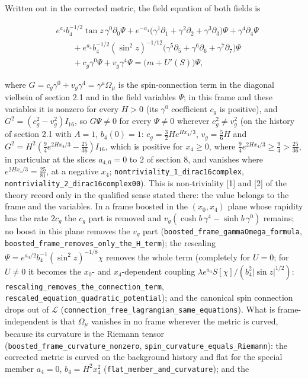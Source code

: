 \documentclass[11pt]{article}
\begin{document}
Written out in the corrected metric, the field equation of both fields is

\[
\begin{aligned}
& e^{a_4}b_4^{-1/2}\tan z\,\gamma^0\partial_0\Psi + e^{-a_4}\big(\gamma^1\partial_1+\gamma^2\partial_2+\gamma^3\partial_3\big)\Psi + \gamma^4\partial_4\Psi \\
& \qquad + e^{a_4}b_4^{-1/2}(\sin^2 z)^{-1/12}\big(\gamma^5\partial_5+\gamma^6\partial_6+\gamma^7\partial_7\big)\Psi \\
& \qquad + c_g\gamma^0\Psi + v_g\gamma^4\Psi = \big(m + U'(S)\big)\Psi ,
\end{aligned}
\]

where $G = c_g\gamma^0 + v_g\gamma^4 = \gamma^\mu\Omega_\mu$ is the spin-connection term in the diagonal vielbein of section 2.1 and in the field variables $\Psi$; in this frame and these variables it is nonzero for every $H > 0$ (its $\gamma^0$ coefficient $c_g$ is positive), and $G^2 = (c_g^2 - v_g^2)I_{16}$, so $G\Psi \neq 0$ for every $\Psi \neq 0$ wherever $c_g^2 \neq v_g^2$ (on the history of section 2.1 with $A = 1$, $b_4(0) = 1$: $c_g = \frac32He^{Hx_4/3}$, $v_g = \frac56H$ and $G^2 = H^2(\frac94e^{2Hx_4/3} - \frac{25}{36})I_{16}$, which is positive for $x_4 \geq 0$, where $\frac94e^{2Hx_4/3} \geq \frac94 > \frac{25}{36}$, in particular at the slices $a_{4,0} = 0$ to $2$ of section 8, and vanishes where $e^{2Hx_4/3} = \frac{25}{81}$, at a negative $x_4$; \texttt{nontrivi\allowbreak{}ality\_1\_\allowbreak{}dirac16c\allowbreak{}omplex}, \texttt{nontrivi\allowbreak{}ality\_2\_\allowbreak{}dirac16c\allowbreak{}omplex00}). This is non-triviality [1] and [2] of the theory record only in the qualified sense stated there: the value belongs to the frame and the variables. In a frame boosted in the $(x_0, x_4)$ plane whose rapidity has the rate $2c_g$ the $c_g$ part is removed and $v_g(\cosh b\,\gamma^4 - \sinh b\,\gamma^0)$ remains; no boost in this plane removes the $v_g$ part (\texttt{boosted\_\allowbreak{}frame\_ga\allowbreak{}mmaOmega\allowbreak{}\_formula}, \texttt{boosted\_\allowbreak{}frame\_re\allowbreak{}moves\_on\allowbreak{}ly\_the\_H\allowbreak{}\_term}); the rescaling $\Psi = e^{a_4/2}b_4^{-1}(\sin^2 z)^{-1/8}\chi$ removes the whole term (completely for $U = 0$; for $U \neq 0$ it becomes the $x_0$- and $x_4$-dependent coupling $\lambda e^{a_4}S[\chi]/(b_4^2|\sin z|^{1/2})$: \texttt{rescalin\allowbreak{}g\_remove\allowbreak{}s\_the\_co\allowbreak{}nnection\allowbreak{}\_term}, \texttt{rescaled\allowbreak{}\_equatio\allowbreak{}n\_quadra\allowbreak{}tic\_pote\allowbreak{}ntial}); and the canonical spin connection drops out of $\mathcal{L}$ (\texttt{connecti\allowbreak{}on\_free\_\allowbreak{}lagrangi\allowbreak{}an\_same\_\allowbreak{}equation\allowbreak{}s}). What is frame-independent is that $\Omega_\mu$ vanishes in no frame wherever the metric is curved, because its curvature is the Riemann tensor (\texttt{boosted\_\allowbreak{}frame\_cu\allowbreak{}rvature\_\allowbreak{}nonzero}, \texttt{spin\_cur\allowbreak{}vature\_e\allowbreak{}quals\_Ri\allowbreak{}emann}): the corrected metric is curved on the background history and flat for the special member $a_4 = 0$, $b_4 = H^2x_4^2$ (\texttt{flat\_mem\allowbreak{}ber\_and\_\allowbreak{}curvatur\allowbreak{}e}); and the 
\end{document}
